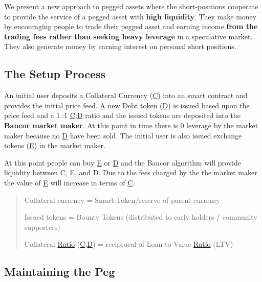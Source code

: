 We present a new approach to pegged assets where the short-\/positions cooperate to provide the service of a pegged asset with {\bfseries high liquidity}. They make money by encouraging people to trade their pegged asset and earning income {\bfseries from the trading fees rather than seeking heavy leverage} in a speculative market. They also generate money by earning interest on personal short positions.

\subsection*{The Setup Process }

An initial user deposits a Collateral Currency (\mbox{\hyperlink{struct_c}{C}}) into an smart contract and provides the initial price feed. \mbox{\hyperlink{struct_a}{A}} new Debt token (\mbox{\hyperlink{struct_d}{D}}) is issued based upon the price feed and a 1.\+:1 \mbox{\hyperlink{struct_c}{C}}\+:\mbox{\hyperlink{struct_d}{D}} ratio and the issued tokens are deposited into the {\bfseries Bancor market maker}. At this point in time there is 0 leverage by the market maker because no \mbox{\hyperlink{struct_d}{D}} have been sold. The initial user is also issued exchange tokens (\mbox{\hyperlink{struct_e}{E}}) in the market maker.

At this point people can buy \mbox{\hyperlink{struct_e}{E}} or \mbox{\hyperlink{struct_d}{D}} and the Bancor algorithm will provide liquidity between \mbox{\hyperlink{struct_c}{C}}, \mbox{\hyperlink{struct_e}{E}}, and \mbox{\hyperlink{struct_d}{D}}. Due to the fees charged by the the market maker the value of \mbox{\hyperlink{struct_e}{E}} will increase in terms of \mbox{\hyperlink{struct_c}{C}}.

\begin{quote}
Collateral currency = Smart Token/reserve of parent currency

Issued tokens = Bounty Tokens (distributed to early holders / community supporters)

Collateral \mbox{\hyperlink{class_ratio}{Ratio}} (\mbox{\hyperlink{struct_c}{C}}\+:\mbox{\hyperlink{struct_d}{D}}) = reciprocal of Loan-\/to-\/\+Value \mbox{\hyperlink{class_ratio}{Ratio}} (L\+TV) \end{quote}


\subsection*{Maintaining the Peg }

